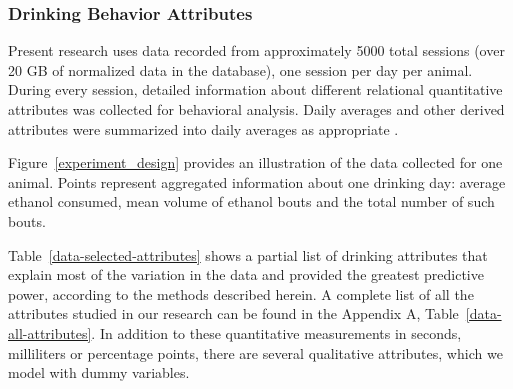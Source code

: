 		\subsubsection{Drinking Behavior Attributes}
		Present research uses data recorded from approximately 5000 total sessions (over 20 GB of normalized data in the database), one session per day per animal. During every session, detailed information about different relational quantitative attributes was collected for behavioral analysis. Daily averages and other derived attributes were summarized into daily averages as appropriate .
		
		Figure~\ref{experiment_design} provides an illustration of the data collected for one animal. Points represent aggregated information about one drinking day: average ethanol consumed, mean volume of ethanol bouts and the total number of such bouts.
		
		Table~\ref{data-selected-attributes} shows a partial list of drinking attributes that explain most of the variation in the data and provided the greatest predictive power, according to the methods described herein. A complete list of all the attributes studied in our research can be found in the Appendix A, Table~\ref{data-all-attributes}. In addition to these quantitative measurements in seconds, milliliters or percentage points, there are several qualitative attributes, which we model with dummy variables.
		
